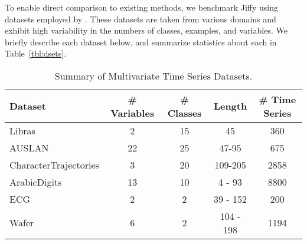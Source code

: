 To enable direct comparison to existing methods, we benchmark Jiffy using datasets employed by \citet{mddtw}. These datasets are taken from various domains and exhibit high variability in the numbers of classes, examples, and variables. We briefly describe each dataset below, and summarize statistics about each in Table~\ref{tbl:dsets}. %

\vspace{6mm}
\begin{table*}[h]
  \centering
  \caption{Summary of Multivariate Time Series Datasets.}
  \label{tbl:dsets}
\begin{tabular}{l|c|c|c|c}
Dataset & \# Variables & \# Classes & Length & \# Time Series  \\
\hline
Libras                	& 2    	& 15 & 45 		& 360 	\\
AUSLAN                  & 22    & 25 & 47-95 	& 675  	\\
CharacterTrajectories	& 3    	& 20 & 109-205 	& 2858 	\\ 
ArabicDigits 			& 13 	& 10 & 4 - 93 	& 8800	\\
ECG 					& 2    	& 2  & 39 - 152 & 200	\\
Wafer 					& 6    	& 2  & 104 - 198 & 1194	\\
\end{tabular}
\label{tab:2}
\end{table*}


